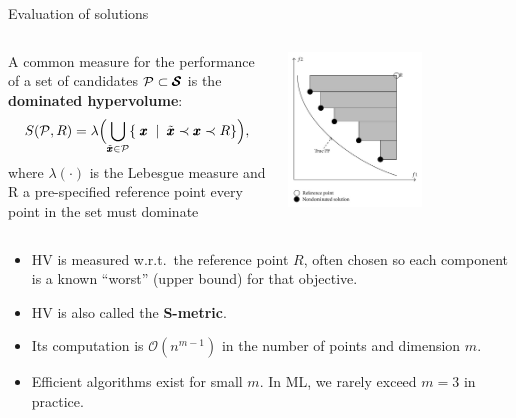 \documentclass[11pt,compress,t,notes=noshow,xcolor=table]{beamer}
\begin{document}
\begin{vbframe}{Evaluation of solutions}

\begin{columns}
\begin{column}{0.5\textwidth}
{\footnotesize A common measure for the performance of a set of candidates 
\(\mathcal{P}\subset\pmb{\mathcal{S}}\) is the \textbf{dominated hypervolume}:
\[
S(\mathcal{P},R) 
  = \lambda\Bigl(
      \bigcup_{\tilde{\pmb{x}}\in \mathcal{P}} 
         \{\;\pmb{x} \;\mid\; 
              \tilde{\pmb{x}}\prec \pmb{x} \prec R
         \}
    \Bigr),
\]
where \(\lambda(\cdot)\) is the Lebesgue measure and R a pre-specified reference point every point in the set must dominate}
\end{column}
\begin{column}{0.5\textwidth}
\begin{center}
\includegraphics[width=0.6\textwidth]{figure_man/dominated_hypervolume.png}
\end{center}
\end{column}
\end{columns}



{\footnotesize
\begin{itemize}
\item HV is measured w.r.t.\ the reference point \(R\), often chosen so each 
      component is a known “worst” (upper bound) for that objective.
\item HV is also called the \textbf{S-metric}.
\item Its computation is \(\mathcal{O}(n^{m-1})\) in the number of points 
      and dimension \(m\).
\item Efficient algorithms exist for small \(m\). 
      In ML, we rarely exceed \(m=3\) in practice.
\end{itemize}
}

\end{vbframe}

\endlecture
\end{document}
